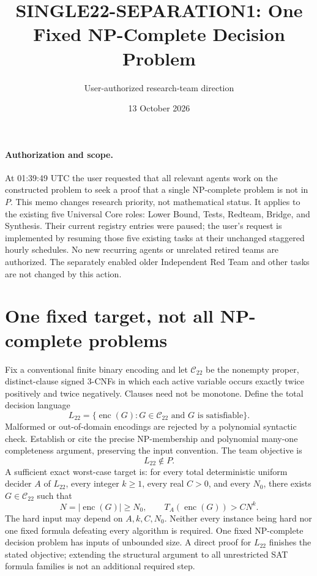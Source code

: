 \documentclass[11pt]{article}
\title{SINGLE22-SEPARATION1: One Fixed NP-Complete Decision Problem}
\author{User-authorized research-team direction}
\date{13 October 2026}
\begin{document}
\maketitle
\paragraph{Authorization and scope.}
At 01:39:49 UTC the user requested that all relevant agents work on the constructed problem to seek a proof that a single NP-complete problem is not in $P$. This memo changes research priority, not mathematical status. It applies to the existing five Universal Core roles: Lower Bound, Tests, Redteam, Bridge, and Synthesis. Their current registry entries were paused; the user's request is implemented by resuming those five existing tasks at their unchanged staggered hourly schedules. No new recurring agents or unrelated retired teams are authorized. The separately enabled older Independent Red Team and other tasks are not changed by this action.

\section{One fixed target, not all NP-complete problems}
Fix a conventional finite binary encoding and let $\mathcal C_{22}$ be the nonempty proper, distinct-clause signed 3-CNFs in which each active variable occurs exactly twice positively and twice negatively. Clauses need not be monotone. Define the total decision language
\[
 L_{22}=\{\operatorname{enc}(G):G\in\mathcal C_{22}\text{ and }G\text{ is satisfiable}\}.
\]
Malformed or out-of-domain encodings are rejected by a polynomial syntactic check. Establish or cite the precise NP-membership and polynomial many-one completeness argument, preserving the input convention. The team objective is
\[
 L_{22}\notin P.
\]
A sufficient exact worst-case target is: for every total deterministic uniform decider $A$ of $L_{22}$, every integer $k\ge1$, every real $C>0$, and every $N_0$, there exists $G\in\mathcal C_{22}$ such that
\[
 N=|\operatorname{enc}(G)|\ge N_0,\qquad T_A(\operatorname{enc}(G))>CN^k.
\]
The hard input may depend on $A,k,C,N_0$. Neither every instance being hard nor one fixed formula defeating every algorithm is required. One fixed NP-complete decision problem has inputs of unbounded size. A direct proof for $L_{22}$ finishes the stated objective; extending the structural argument to all unrestricted SAT formula families is not an additional required step.
\end{document}
